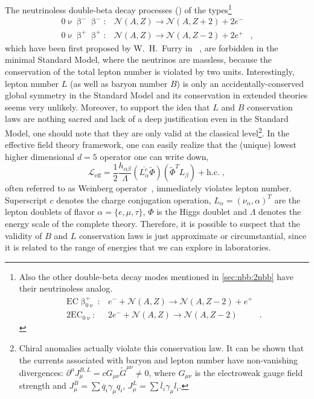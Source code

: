 The neutrinoless double-beta decay processes (\onbb) of the types\footnote{%
  Also the other double-beta decay modes mentioned in \cref{sec:nbb:2nbb} have their
  neutrinoless analog.
  \[
    \begin{array}{lrl}
      \text{EC}\upbeta^+_{0\upnu}: &
        e^- + \mathcal{N}(A,Z) \rightarrow \mathcal{N}(A,Z-2) + e^+ & \\
      2\text{EC}_{0\upnu}: &
        2e^- + \mathcal{N}(A,Z) \rightarrow \mathcal{N}(A,Z-2) &.
    \end{array}
  \]
}
\[
  \begin{array}{lrl}
    0\upnu\upbeta^-\upbeta^-: &
      \mathcal{N}(A,Z) \longrightarrow \mathcal{N}(A,Z+2)+2e^- & \\
    0\upnu\upbeta^+\upbeta^+: &
      \mathcal{N}(A,Z) \longrightarrow \mathcal{N}(A,Z-2)+2e^+ &,
  \end{array}
\]
which have been first proposed by W.~H.~Furry in ~\cite{Furry1939}, are forbidden in
the minimal Standard Model, where the neutrinos are massless, because the conservation of
the total lepton number is violated by two units.  Interestingly, lepton number $L$ (as
well as baryon number $B$) is only an accidentally-conserved global symmetry in the
Standard Model and its conservation in extended theories seems very unlikely. Moreover, to
support the idea that $L$ and $B$ conservation laws are nothing sacred and lack of a deep
justification even in the Standard Model, one should note that they are only valid at the
classical level\footnote{%
  Chiral anomalies actually violate this conservation law. It can be shown that the
  currents associated with baryon and lepton number have non-vanishing divergences:
  $\partial^\mu J_\mu^{B,L} = c G_{\mu\nu} \widetilde{G}^{\mu\nu} \neq 0$, where
  $G_{\mu\nu}$ is the electroweak gauge field strength and $J_\mu^B = \sum \overline{q}_i
  \gamma_\mu q_i$, $J_\mu^L = \sum \overline{l}_i \gamma_\mu l_i$.
}. In the effective field theory framework, one can easily realize that the (unique)
lowest higher dimensional $d=5$ operator one can write down,
\[
  \mathcal{L}_\text{eff} = \frac{1}{2} \frac{h_{\alpha\beta}}{\Lambda}
                           (\overline{L_\alpha^c}\widetilde{\Phi})
                           (\widetilde{\Phi}^T L_\beta) + \text{h.c.} \;,
\]
often referred to as Weinberg operator~\cite{Weinberg1979}, immediately violates lepton
number. Superscript $c$ denotes the charge conjugation operation, $L_\alpha =
(\nu_\alpha, \alpha)^T$ are the lepton doublets of flavor $\alpha = \{e, \mu, \tau\}$, $\Phi$
is the Higgs doublet and $\Lambda$ denotes the energy scale of the complete theory.
Therefore, it is possible to suspect that the validity of $B$ and $L$ conservation laws is
just approximate or circumstantial, since it is related to the range of energies that we
can explore in laboratories.

